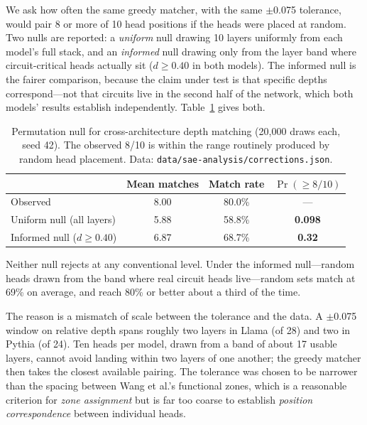 \documentclass[11pt,a4paper]{article}
\begin{document}
We ask how often the same greedy matcher, with the same $\pm$0.075 tolerance, would
pair 8 or more of 10 head positions if the heads were placed at random. Two nulls are
reported: a \emph{uniform} null drawing 10 layers uniformly from each model's full
stack, and an \emph{informed} null drawing only from the layer band where
circuit-critical heads actually sit ($d \geq 0.40$ in both models). The informed null
is the fairer comparison, because the claim under test is that specific depths
correspond---not that circuits live in the second half of the network, which both
models' results establish independently. Table~\ref{tab:depth-null} gives both.

\begin{table}[H]
  \centering
  \caption{Permutation null for cross-architecture depth matching (20{,}000 draws each,
    seed 42). The observed 8/10 is within the range routinely produced by random head
    placement. Data: \texttt{data/sae-analysis/corrections.json}.}
  \label{tab:depth-null}
  \smallskip
  \begin{tabular}{lccc}
    \toprule
    & Mean matches & Match rate & $\Pr(\geq 8/10)$ \\
    \midrule
    Observed                       & 8.00 & 80.0\% & --- \\
    Uniform null (all layers)      & 5.88 & 58.8\% & \textbf{0.098} \\
    Informed null ($d \geq 0.40$)  & 6.87 & 68.7\% & \textbf{0.32} \\
    \bottomrule
  \end{tabular}
\end{table}

Neither null rejects at any conventional level. Under the informed null---random heads
drawn from the band where real circuit heads live---random sets match at 69\% on
average, and reach 80\% or better about a third of the time.

The reason is a mismatch of scale between the tolerance and the data. A $\pm$0.075
window on relative depth spans roughly two layers in Llama (of 28) and two in Pythia
(of 24). Ten heads per model, drawn from a band of about 17 usable layers, cannot
avoid landing within two layers of one another; the greedy matcher then takes the
closest available pairing. The tolerance was chosen to be narrower than the spacing
between Wang et al.'s functional zones, which is a reasonable criterion for
\emph{zone assignment} but is far too coarse to establish \emph{position
correspondence} between individual heads.
\end{document}
